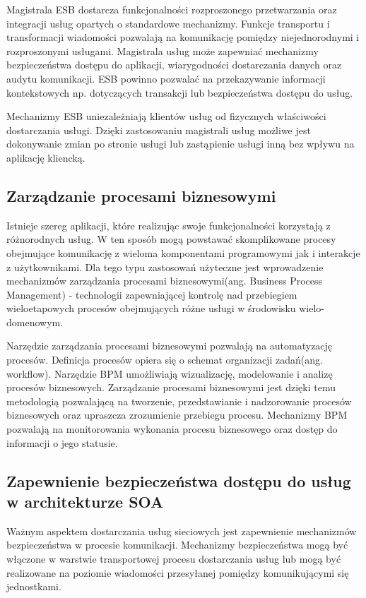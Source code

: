 		Magistrala ESB dostarcza funkcjonalności rozproszonego przetwarzania oraz integracji usług opartych o standardowe mechanizmy. Funkcje transportu i transformacji wiadomości pozwalają na komunikację pomiędzy niejednorodnymi i rozproszonymi usługami. Magistrala usług może zapewniać mechanizmy bezpieczeństwa dostępu do aplikacji, wiarygodności dostarczania danych oraz audytu komunikacji. ESB powinno pozwalać na przekazywanie informacji kontekstowych np. dotyczących transakcji lub bezpieczeństwa dostępu do usług.

		Mechanizmy ESB uniezależniają klientów usług od fizycznych właściwości dostarczania usługi. Dzięki zastosowaniu magistrali usług możliwe jest dokonywanie zmian po stronie usługi lub zastąpienie usługi inną bez wpływu na aplikację kliencką. 

	\subsection{Zarządzanie procesami biznesowymi} 

		Istnieje szereg aplikacji, które realizując swoje funkcjonalności korzystają z różnorodnych usług. W ten sposób mogą powstawać skomplikowane procesy obejmujące komunikację z wieloma komponentami programowymi jak i interakcje z użytkownikami. Dla tego typu zastosowań użyteczne jest wprowadzenie mechanizmów zarządzania procesami biznesowymi(ang. Business Process Management) - technologii zapewniającej kontrolę nad przebiegiem wieloetapowych procesów obejmujących różne usługi w środowisku wielo-domenowym.

		Narzędzie zarządzania procesami biznesowymi pozwalają na automatyzację procesów. Definicja procesów opiera się o schemat organizacji zadań(ang. workflow). Narzędzie BPM umożliwiają wizualizację, modelowanie i analizę procesów biznesowych. Zarządzanie procesami biznesowymi jest dzięki temu metodologią pozwalającą na tworzenie, przedstawianie i nadzorowanie procesów biznesowych oraz upraszcza zrozumienie przebiegu procesu. Mechanizmy BPM pozwalają na monitorowania wykonania procesu biznesowego oraz dostęp do informacji o jego statusie. 

	\subsection{Zapewnienie bezpieczeństwa dostępu do usług w architekturze SOA}

		Ważnym aspektem dostarczania usług sieciowych jest zapewnienie mechanizmów bezpieczeństwa w procesie komunikacji. Mechanizmy bezpieczeństwa mogą być włączone w warstwie transportowej procesu dostarczania usług lub mogą być realizowane na poziomie wiadomości przesyłanej pomiędzy komunikującymi się jednostkami\cite{Szychowiak09}. 

